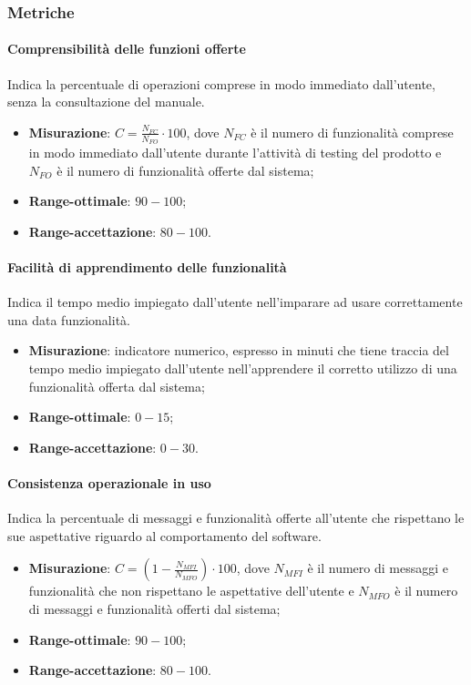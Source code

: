 \subsubsection{Metriche}
\paragraph{Comprensibilità delle funzioni offerte}
Indica la percentuale di operazioni comprese in modo immediato dall'utente, senza la consultazione del manuale.
\begin{itemize}
\item \textbf{Misurazione}: $C=\frac{N_{FC}}{N_{FO}} \cdot 100$, dove $N_{FC}$ è il numero di funzionalità comprese in modo immediato dall'utente durante l'attività di testing del prodotto e $N_{FO}$ è il numero di funzionalità offerte dal sistema;
\item \textbf{Range-ottimale}: $90 - 100$;
\item \textbf{Range-accettazione}: $80 - 100$.
\end{itemize}
\paragraph{Facilità di apprendimento delle funzionalità}
Indica il tempo medio impiegato dall'utente nell'imparare ad usare correttamente una data funzionalità.
\begin{itemize}
\item \textbf{Misurazione}: indicatore numerico, espresso in minuti  che tiene traccia del tempo medio impiegato dall'utente nell'apprendere il corretto utilizzo di una funzionalità offerta dal sistema;
\item \textbf{Range-ottimale}: $0 - 15$;
\item \textbf{Range-accettazione}: $0 - 30$.
\end{itemize}
\paragraph{Consistenza operazionale in uso}
Indica la percentuale di messaggi e funzionalità offerte all'utente che rispettano le sue aspettative riguardo al comportamento del software.
\begin{itemize}
\item \textbf{Misurazione}: $C=(1-\frac{N_{MFI}}{N_{MFO}}) \cdot 100$, dove $N_{MFI}$ è il numero di messaggi e funzionalità che non rispettano le aspettative dell'utente e $N_{MFO}$ è il numero di messaggi e funzionalità offerti dal sistema;
\item \textbf{Range-ottimale}: $90 - 100$;
\item \textbf{Range-accettazione}: $80 - 100$.
\end{itemize}

